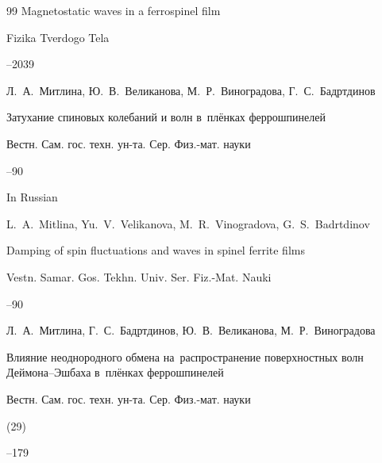 \begin{thebibliography}{99}
\paper Magnetostatic waves in a ferrospinel film

\jour Fizika Tverdogo Tela




--2039






\by Л.~А.~Митлина, Ю.~В.~Великанова, М.~Р.~Виноградова, Г.~С.~Бадртдинов

\paper Затухание спиновых колебаний и волн в~плёнках феррошпинелей

\jour Вестн. Сам. гос. техн. ун-та. Сер. Физ.-мат. науки



--90



\misctransl

\lang In Russian

\by L.~A.~Mitlina, Yu.~V.~Velikanova, M.~R.~Vinogradova, G.~S.~Badrtdinov

\paper Damping of spin fluctuations and waves in  spinel ferrite films

\jour Vestn. Samar. Gos. Tekhn. Univ. Ser. Fiz.-Mat. Nauki



--90








\by Л.~А.~Митлина, Г.~С.~Бадртдинов, Ю.~В.~Великанова, М.~Р.~Виноградова

\paper Влияние неоднородного обмена на~распространение поверхностных волн Деймона--Эшбаха в~плёнках феррошпинелей

\jour Вестн. Сам. гос. техн. ун-та. Сер. Физ.-мат. науки


(29)

--179




\end{thebibliography}
